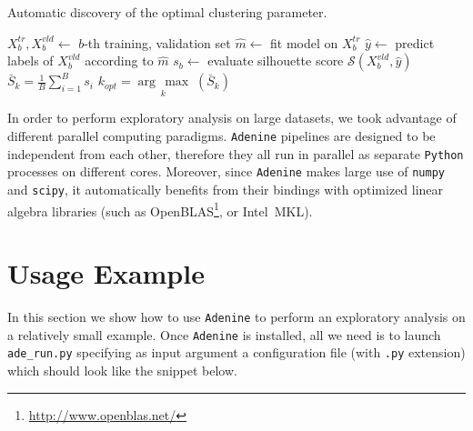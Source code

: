 \documentclass[twoside,11pt]{article}
\makeatletter
\newcommand{\argmax}[1]{\underset{#1}{\operatorname{arg}\,\operatorname{max}}\;}
\newcommand{\ade}{\texttt{Adenine}\@\xspace}
\newcommand{\py}{\texttt{Python}\@\xspace}
\makeatother
\begin{document}
\begin{enumerate}
\begin{algorithm}
\caption{Automatic discovery of the optimal clustering parameter.}\label{alg:clusters}
\label{alg:clusters}
\begin{algorithmic}[1]
                \State $X^{tr}_b,X^{vld}_b\leftarrow$ $b$-th training, validation set
                \State $\hat{m}\leftarrow$ fit model on $X^{tr}_b$
                \State $\hat{y}\leftarrow$ predict labels of $X^{vld}_b$ according to $\hat{m}$
                \State $s_b\leftarrow$ evaluate silhouette score  $\mathcal{S}(X^{vld}_b,\hat{y})$
	\EndFor    
	\State $\bar{S}_k = \frac{1}{B}\sum_{i=1}^B s_i$
\EndFor
\State $k_{opt} = \argmax{k}(\bar{S}_k)$
\end{algorithmic}
\end{algorithm}

\end{enumerate}

\noindent In order to perform exploratory analysis on large datasets, we took advantage of different parallel computing paradigms. \ade pipelines are designed to be independent from each other, therefore they all run in parallel as separate \py processes on different cores. Moreover, since \ade makes large use of \texttt{numpy} and \texttt{scipy}, it automatically benefits from their bindings with optimized linear algebra libraries (such as OpenBLAS\footnote{\href{http://www.openblas.net/}{http://www.openblas.net/}}, or Intel\textsuperscript{\textregistered}~MKL).

\section{Usage Example}
In this section we show how to use \ade to perform an exploratory analysis on a relatively small example. Once \ade is installed, all we need is to launch \texttt{ade\_run.py} specifying as input argument a configuration file (with \texttt{.py} extension) which should look like the snippet below.
 

\end{document}
